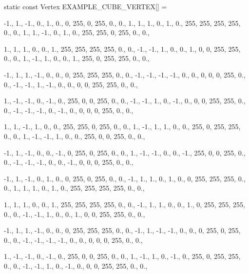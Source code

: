\begin{multicols}{2}
\begin{ccode}
static const Vertex EXAMPLE_CUBE_VERTEX[] = {
    {{-1.,  1., -1.}, { 0.,  1.,  0.}, {  0, 255,   0, 255}, {0., 0.}},
    {{ 1.,  1.,  1.}, { 0.,  1.,  0.}, {255, 255, 255, 255}, {0., 0.}},
    {{ 1.,  1., -1.}, { 0.,  1.,  0.}, {255, 255,   0, 255}, {0., 0.}},

    {{ 1.,  1.,  1.}, { 0.,  0.,  1.}, {255, 255, 255, 255}, {0., 0.}},
    {{-1., -1.,  1.}, { 0.,  0.,  1.}, {  0,   0, 255, 255}, {0., 0.}},
    {{ 1., -1.,  1.}, { 0.,  0.,  1.}, {255,   0, 255, 255}, {0., 0.}},

    {{-1.,  1.,  1.}, {-1.,  0.,  0.}, {  0, 255, 255, 255}, {0., 0.}},
    {{-1., -1., -1.}, {-1.,  0.,  0.}, {  0,   0,   0, 255}, {0., 0.}},
    {{-1., -1.,  1.}, {-1.,  0.,  0.}, {  0,   0, 255, 255}, {0., 0.}},

    {{ 1., -1., -1.}, { 0., -1.,  0.}, {255,   0,   0, 255}, {0., 0.}},
    {{-1., -1.,  1.}, { 0., -1.,  0.}, {  0,   0, 255, 255}, {0., 0.}},
    {{-1., -1., -1.}, { 0., -1.,  0.}, {  0,   0,   0, 255}, {0., 0.}},

    {{ 1.,  1., -1.}, { 1.,  0.,  0.}, {255, 255,   0, 255}, {0., 0.}},
    {{ 1., -1.,  1.}, { 1.,  0.,  0.}, {255,   0, 255, 255}, {0., 0.}},
    {{ 1., -1., -1.}, { 1.,  0.,  0.}, {255,   0,   0, 255}, {0., 0.}},

    {{-1.,  1., -1.}, { 0.,  0., -1.}, {  0, 255,   0, 255}, {0., 0.}},
    {{ 1., -1., -1.}, { 0.,  0., -1.}, {255,   0,   0, 255}, {0., 0.}},
    {{-1., -1., -1.}, { 0.,  0., -1.}, {  0,   0,   0, 255}, {0., 0.}},

    {{-1.,  1., -1.}, { 0.,  1.,  0.}, {  0, 255,   0, 255}, {0., 0.}},
    {{-1.,  1.,  1.}, { 0.,  1.,  0.}, {  0, 255, 255, 255}, {0., 0.}},
    {{ 1.,  1.,  1.}, { 0.,  1.,  0.}, {255, 255, 255, 255}, {0., 0.}},

    {{ 1.,  1.,  1.}, { 0.,  0.,  1.}, {255, 255, 255, 255}, {0., 0.}},
    {{-1.,  1.,  1.}, { 0.,  0.,  1.}, {  0, 255, 255, 255}, {0., 0.}},
    {{-1., -1.,  1.}, { 0.,  0.,  1.}, {  0,   0, 255, 255}, {0., 0.}},

    {{-1.,  1.,  1.}, {-1.,  0.,  0.}, {  0, 255, 255, 255}, {0., 0.}},
    {{-1.,  1., -1.}, {-1.,  0.,  0.}, {  0, 255,   0, 255}, {0., 0.}},
    {{-1., -1., -1.}, {-1.,  0.,  0.}, {  0,   0,   0, 255}, {0., 0.}},

    {{ 1., -1., -1.}, { 0., -1.,  0.}, {255,   0,   0, 255}, {0., 0.}},
    {{ 1., -1.,  1.}, { 0., -1.,  0.}, {255,   0, 255, 255}, {0., 0.}},
    {{-1., -1.,  1.}, { 0., -1.,  0.}, {  0,   0, 255, 255}, {0., 0.}},

}
\end{ccode}
\end{multicols}

